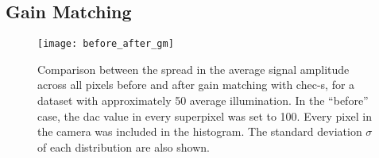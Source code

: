 \subsection{Gain Matching}

\begin{figure}
	\centering
    \texttt{[image: before\_after\_gm]} 
	\caption[Gain-Matching Residuals]{Comparison between the spread in the average signal amplitude across all pixels before and after gain matching with \gls{chec-s}, for a dataset with approximately \SI{50}{\pe} average illumination. In the ``before'' case, the \gls{dac} value in every superpixel was set to 100. Every pixel in the camera was included in the histogram. The standard deviation $\sigma$ of each distribution are also shown.} 
	\label{fig:before_after_gm}
\end{figure}

